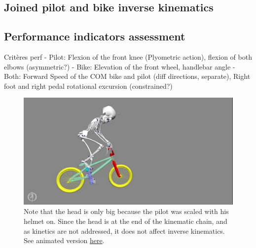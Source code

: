 \subsection{Joined pilot and bike inverse kinematics}





\subsection{Performance indicators assessment}
Critères perf
- Pilot: Flexion of the front knee (Plyometric action), flexion of both elbows (asymmetric?)
- Bike: Elevation of the front wheel, handlebar angle
- Both: Forward Speed of the COM bike and pilot (diff directions, separate), Right foot and right pedal rotational excursion (constrained?) %




\begin{figure}[hbtp]
	\centering
	\def\svgwidth{1\columnwidth}
	\fontsize{10pt}{10pt}\selectfont
	\includegraphics[width=\linewidth]{"../Chap7/Figures/BMXPilot.png"}
	\caption{Note that the head is only big because the pilot was scaled with his helmet on. Since the head is at the end of the kinematic chain, and as kinetics are not addressed, it does not affect inverse kinematics. See animated version \href{https://github.com/perfanalytics/pose2sim/blob/main/Content/Activities_verylow.gif}{here}.}
	\label{fig_bmxpilot}
\end{figure}

